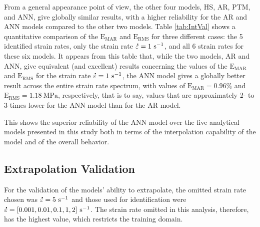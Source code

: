 \documentclass[metals,article,accept,pdftex,moreauthors]{Definitions/mdpi}
\DeclareRobustCommand{\mdot}[1]{\accentset{\mbox{\bfseries .}}{#1}}
\DeclareRobustCommand{\RMSE}{\text{E}_\text{RMS}}
\DeclareRobustCommand{\MARE}{\text{E}_\text{MAR}}
\DeclareRobustCommand{\ps}{\text{s}^{-1}}
\DeclareRobustCommand{\MPa}{\text{MPa}}
\begin{document}
From a general appearance point of view, the other four models, HS, AR, PTM, and ANN, give globally similar results, with a higher reliability for the AR and ANN models compared to the other two models.
Table \ref{tab:IntVal} shows a quantitative comparison of the $\MARE$ and $\RMSE$ for three different cases: the 5 identified strain rates, only the strain rate $\mdot\varepsilon=1~\ps$, and all 6 strain rates for these six models.
It appears from this table that, while the two models, AR and ANN, give equivalent (and excellent) results concerning the values of the $\MARE$ and $\RMSE$ for the strain rate $\mdot\varepsilon=1~\ps$, the ANN model gives a globally better result across the entire strain rate spectrum, with values of $\MARE=0.96\%$ and $\RMSE=1.18~\MPa$, respectively, that is to say, values that are approximately 2- to 3-times lower for the ANN model than for the AR model.

This shows the superior reliability of the ANN model over the five analytical models presented in this study both in terms of the interpolation capability of the model and of the overall behavior.

\subsection{Extrapolation Validation}

For the validation of the models' ability to extrapolate, the omitted strain rate chosen was $\mdot\varepsilon=5~\ps$ and those used for identification were $\mdot\varepsilon=[0.001, 0.01, 0.1, 1, 2]~\ps$.
The strain rate omitted in this analysis, therefore, has the highest value, which restricts the training domain.
\end{document}
